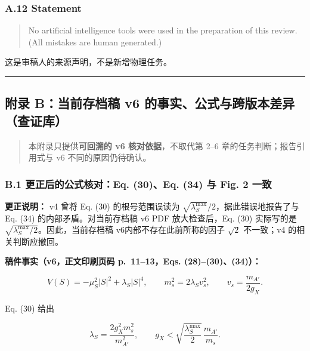 \documentclass[
  chinese,
  UTF8]{ctexart}
\begin{document}
\subsubsection{A.12 Statement}\label{a.12-statement}

\begin{quote}
No artificial intelligence tools were used in the preparation of this
review. (All mistakes are human generated.)
\end{quote}

这是审稿人的来源声明，不是新增物理任务。

\begin{center}\rule{0.5\linewidth}{0.5pt}\end{center}

\subsection{附录 B：当前存档稿 v6
的事实、公式与跨版本差异（查证库）}\label{ux9644ux5f55-bux5f53ux524dux5b58ux6863ux7a3f-v6-ux7684ux4e8bux5b9eux516cux5f0fux4e0eux8de8ux7248ux672cux5deeux5f02ux67e5ux8bc1ux5e93}

\begin{quote}
本附录只提供\textbf{可回溯的 v6 核对依据}，不取代第 2--6
章的任务判断；报告引用式与 v6 不同的原因仍待确认。
\end{quote}

\subsubsection{B.1 更正后的公式核对：Eq. (30)、Eq. (34) 与 Fig. 2
一致}\label{b.1-ux66f4ux6b63ux540eux7684ux516cux5f0fux6838ux5bf9eq.-30eq.-34-ux4e0e-fig.-2-ux4e00ux81f4}

\textbf{更正说明：} v4 曾将 Eq. (30) 的根号范围误读为
\(\sqrt{\lambda_S^{\max}}/2\)，据此错误地报告了与 Eq. (34)
的内部矛盾。对当前存档稿 v6 PDF 放大检查后，Eq. (30) 实际写的是
\(\sqrt{\lambda_S^{\max}/2}\)。因此，当前存档稿
v6内部不存在此前所称的因子 \(\sqrt{2}\) 不一致；v4 的相关判断应撤回。

\textbf{稿件事实（v6，正文印刷页码 p.~11--13，Eqs. (28)--(30)、(34)）：}

\[
V(S)=-\mu_S^2|S|^2+\lambda_S|S|^4,\qquad
m_s^2=2\lambda_S v_s^2,\qquad
v_s=\frac{m_{A'}}{2g_X}.
\]

Eq. (30) 给出

\[
\lambda_S=\frac{2g_X^2m_s^2}{m_{A'}^2},\qquad
 g_X<\sqrt{\frac{\lambda_S^{\max}}{2}}\,\frac{m_{A'}}{m_s}.
\tag{30}
\]
\end{document}
